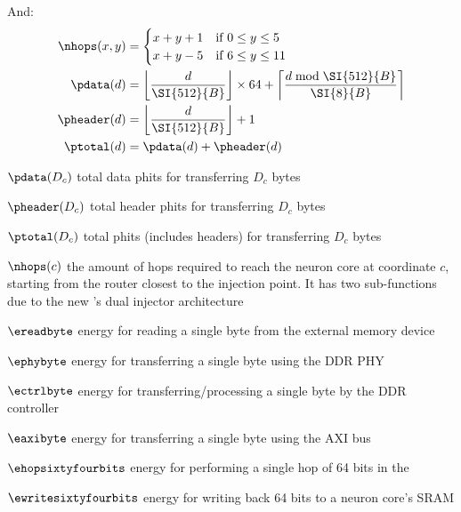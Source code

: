 And:
\begin{align*} 
\nhops(x,y) &=
    \begin{cases} 
        x + y + 1 & \textrm{if } 0 \leq y \leq 5 \\
        x + y - 5 & \text{if } 6 \leq y \leq 11
    \end{cases}
    \\
    \pdata(d) &=
        \left\lfloor \frac{d}{\SI{512}{B}} \right\rfloor \times 64 + \left\lceil \frac{d \bmod \SI{512}{B}}{\SI{8}{B}} \right\rceil
    \\
    \pheader(d) &=
        \left\lfloor \frac{d}{\SI{512}{B}} \right\rfloor + 1
    \\
    \ptotal(d) &=
        \pdata(d) + \pheader(d)
\end{align*}

\begin{eqexpl}[30mm]
    \item{$\pdata(D_c)$} total data phits for transferring $D_c$ bytes
    \item{$\pheader(D_c)$} total header phits for transferring $D_c$ bytes
    \item{$\ptotal(D_c)$} total phits (includes headers) for transferring $D_c$ bytes
    \item{$\nhops(c)$} the amount of hops required to reach the neuron core at coordinate $c$, starting from the router closest to the injection point. It has two sub-functions due to the new \confignoc{}'s dual injector architecture
    \item{$\ereadbyte$} energy for reading a single byte from the external memory device
    \item{$\ephybyte$} energy for transferring a single byte using the DDR PHY
    \item{$\ectrlbyte$} energy for transferring/processing a single byte by the DDR controller
    \item{$\eaxibyte$} energy for transferring a single byte using the AXI bus
    \item{$\ehopsixtyfourbits$} energy for performing a single hop of 64 bits in the \confignoc{}
    \item{$\ewritesixtyfourbits$} energy for writing back 64 bits to a neuron core's SRAM
\end{eqexpl}

